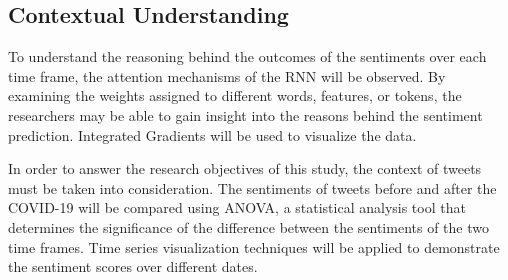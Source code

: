\documentclass[journal]{./IEEE/IEEEtran}
\begin{document}
\subsection{Contextual Understanding}
To understand the reasoning behind the outcomes of the sentiments over each time frame, the attention mechanisms of the RNN will be observed. By examining the weights assigned to different words, features, or tokens, the researchers may be able to gain insight into the reasons behind the sentiment prediction. Integrated Gradients will be used to visualize the data. 

	In order to answer the research objectives of this study, the context of tweets must be taken into consideration. The sentiments of tweets before and after the COVID-19 will be compared using ANOVA, a statistical analysis tool that determines the significance of the difference between the sentiments of the two time frames. Time series visualization techniques will be applied to demonstrate the sentiment scores over different dates. 










\end{document}
